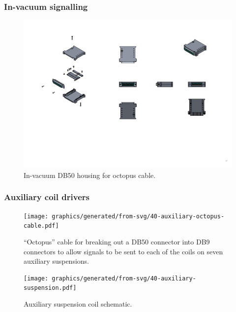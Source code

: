 \subsubsection{In-vacuum signalling}

\begin{figure}
  \centering
  \includegraphics[width=0.75\columnwidth]{graphics/40-db50-housing.png}
  \caption[In-vacuum DB50 octopus cable housing]{In-vacuum DB50 housing for octopus cable.}
  \label{fig:db50-housing}
\end{figure}

\subsubsection{Auxiliary coil drivers}

\begin{figure}
  \centering
  \texttt{[image: graphics/generated/from-svg/40-auxiliary-octopus-cable.pdf]}
  \caption[Auxiliary octopus cable schematic]{\label{fig:aux-octopus-cable-wiring}``Octopus'' cable for breaking out a DB50 connector into DB9 connectors to allow signals to be sent to each of the coils on seven auxiliary suspensions.}
\end{figure}

\begin{figure}
  \centering
  \texttt{[image: graphics/generated/from-svg/40-auxiliary-suspension.pdf]}
  \caption[Auxiliary suspension coil schematic]{\label{fig:aux-suspension-wiring}Auxiliary suspension coil schematic.}
\end{figure}

